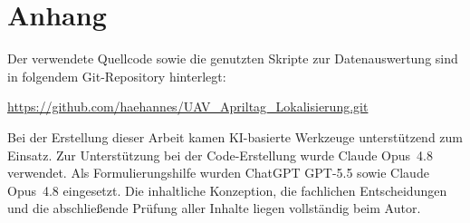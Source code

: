 \chapter{Anhang}
\noindent
Der verwendete Quellcode sowie die genutzten Skripte zur Datenauswertung sind in folgendem Git-Repository hinterlegt:

\url{https://github.com/haehannes/UAV_Apriltag_Lokalisierung.git}

\bigskip
\noindent
Bei der Erstellung dieser Arbeit kamen KI-basierte Werkzeuge unterstützend zum Einsatz.
Zur Unterstützung bei der Code-Erstellung wurde Claude Opus~4.8 verwendet.
Als Formulierungshilfe wurden ChatGPT GPT-5.5 sowie Claude Opus~4.8 eingesetzt.
Die inhaltliche Konzeption, die fachlichen Entscheidungen und die abschließende Prüfung aller Inhalte liegen vollständig beim Autor.